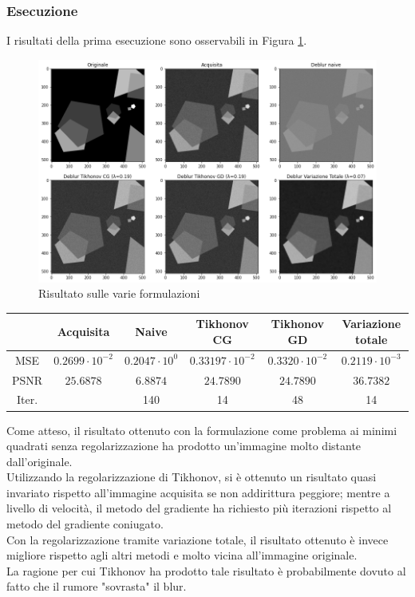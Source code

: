 \documentclass[11pt]{article}
\begin{document}
\subsubsection*{Esecuzione}
I risultati della prima esecuzione sono osservabili in Figura \ref{fig:deblur1}.\\
\begin{figure}[H]
    \centering
    \includegraphics[width=13cm]{esecuzione/1/deblur.png}
    \caption{Risultato sulle varie formulazioni}
    \label{fig:deblur1}
\end{figure}

\begin{center}
    \begin{tabular}{ |c|c|c|c|c|c| }
    \hline
    & Acquisita & Naive & Tikhonov CG & Tikhonov GD & Variazione totale \\ 
    \hline
    MSE & $0.2699 \cdot 10^{-2}$ & $0.2047 \cdot 10^{0}$ & $0.33197 \cdot 10^{-2}$ & $0.3320 \cdot 10^{-2}$ & $0.2119 \cdot 10^{-3}$ \\ 
    PSNR & $25.6878$ & $6.8874$ & $24.7890$ & $24.7890$ & $36.7382$ \\ 
    Iter. & & 140 & 14 & 48 & 14 \\ 
    \hline
    \end{tabular}
\end{center}

Come atteso, il risultato ottenuto con la formulazione come problema ai minimi quadrati senza regolarizzazione ha prodotto un'immagine molto distante dall'originale.\\
Utilizzando la regolarizzazione di Tikhonov, si è ottenuto un risultato quasi invariato rispetto all'immagine acquisita se non addirittura peggiore; mentre a livello di velocità, il metodo del gradiente ha richiesto più iterazioni rispetto al metodo del gradiente coniugato.\\
Con la regolarizzazione tramite variazione totale, il risultato ottenuto è invece migliore rispetto agli altri metodi e molto vicina all'immagine originale.\\
La ragione per cui Tikhonov ha prodotto tale risultato è probabilmente dovuto al fatto che il rumore "sovrasta" il blur.
\end{document}
